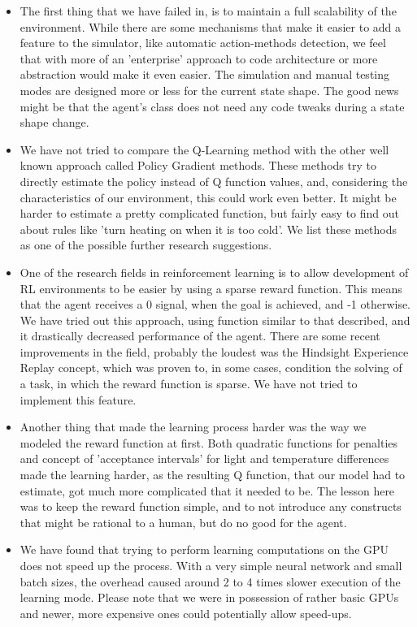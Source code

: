 \documentclass{article}
\begin{document}
\begin{itemize}
\item The first thing that we have failed in, is to maintain a full scalability of the environment. While there are some mechanisms that make it easier to add a feature to the simulator, like automatic action-methods detection, we feel that with more of an 'enterprise' approach to code architecture or more abstraction would make it even easier. The simulation and manual testing modes are designed more or less for the current state shape. The good news might be that the agent's class does not need any code tweaks during a state shape change.

\item We have not tried to compare the Q-Learning method with the other well known approach called Policy Gradient methods. These methods try to directly estimate the policy instead of Q function values, and, considering the characteristics of our environment, this could work even better. It might be harder to estimate a pretty complicated function, but fairly easy to find out about rules like 'turn heating on when it is too cold'. We list these methods as one of the possible further research suggestions.

\item One of the research fields in reinforcement learning is to allow development of RL environments to be easier by using a sparse reward function. This means that the agent receives a 0 signal, when the goal is achieved, and -1 otherwise. We have tried out this approach, using function similar to that described, and it drastically decreased performance of the agent. There are some recent improvements in the field, probably the loudest was the Hindsight Experience Replay concept, which was proven to, in some cases, condition the solving of a task, in which the reward function is sparse. We have not tried to implement this feature.

\item Another thing that made the learning process harder was the way we modeled the reward function at first. Both quadratic functions for penalties and concept of 'acceptance intervals' for light and temperature differences made the learning harder, as the resulting Q function, that our model had to estimate, got much more complicated that it needed to be. The lesson here was to keep the reward function simple, and to not introduce any constructs that might be rational to a human, but do no good for the agent. 

\item We have found that trying to perform learning computations on the GPU does not speed up the process. With a very simple neural network and small batch sizes, the overhead caused around 2 to 4 times slower execution of the learning mode. Please note that we were in possession of rather basic GPUs and newer, more expensive ones could potentially allow speed-ups.


\end{itemize}
\end{document}
